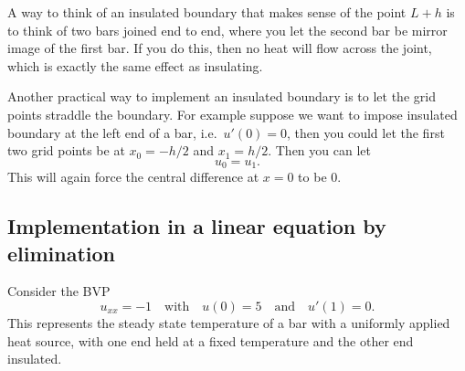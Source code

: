 A way to think of an insulated boundary that makes sense of
the point $L+h$ is to think of two bars joined end to
end, where you let the second bar be mirror image of the first bar. 
If you do this, then no heat will flow across
the joint, which is exactly the same effect as insulating.


Another practical way to implement an insulated boundary is
to let the grid points straddle the boundary. For example
suppose we want to impose insulated boundary at the left end of a
bar, i.e.\ $u'(0) =0$, then you could let the first two grid
points be at $x_0 = -h/2$ and $x_1 = h/2$. Then you can let
$$
u_0 = u_1.
$$
This will again force the central difference at $x=0$ to be $0$.


\subsection*{Implementation in a linear equation by elimination}

Consider the BVP
\begin{equation}\label{linear_insulated}
     u_{xx} = -1\quad\text{with}\quad u(0) = 5\quad\text{and}\quad u'(1) = 0.
 \end{equation}
This represents the steady state temperature of a bar with a uniformly applied
heat source, with one end held at a fixed temperature and the other end insulated.

